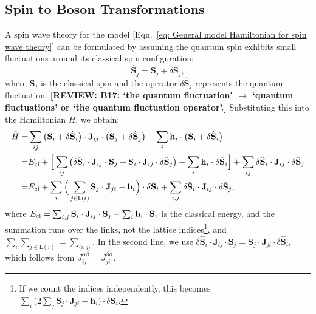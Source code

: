 \documentclass[aps, prx, nofootinbib, superscriptaddress]{revtex4-2}
\newcommand{\REVIEW}[1]{{\color{reviewcolor}\bfseries [REVIEW: #1]}}
\begin{document}
\subsection{Spin to Boson Transformations}\label{subsec: spin-to-boson transformation}
A spin wave theory for the model [Eqn.~\eqref{eq: General model Hamiltonian for spin wave theory}] can be formulated by assuming the quantum spin exhibits small fluctuations around its classical spin configuration:
\begin{equation}
    \hat{\mathbf{S}}_{j} = \mathbf{S}_{j} + \delta \hat{\mathbf{S}}_{j},
\end{equation}
where $\mathbf{S}_{j}$ is the classical spin and the operator $\delta \hat{\mathbf{S}}_{j}$ represents the quantum fluctuation.
\REVIEW{B17: `the quantum fluctuation' $\to$ `quantum fluctuations' or `the quantum fluctuation operator'.}
Substituting this into the Hamiltonian $H$, we obtain:
\begin{align*}
    \hat{H} 
    = & \sum_{ij} \big( \mathbf{S}_{i} + \delta \hat{\mathbf{S}}_{i} \big) \cdot \mathbf{J}_{ij} \cdot \big( \mathbf{S}_{j} + \delta \hat{\mathbf{S}}_{j} \big) - \sum_{i} \mathbf{h}_{i} \cdot \big( \mathbf{S}_{i} + \delta \hat{\mathbf{S}}_{i} \big) \\
    = & E_{\rm cl}
    + \Big[ \sum_{ij} \big( \delta \hat{\mathbf{S}}_{i} \cdot \mathbf{J}_{ij} \cdot \mathbf{S}_{j} + \mathbf{S}_{i} \cdot \mathbf{J}_{ij} \cdot \delta \hat{\mathbf{S}}_{j} \big) - \sum_{i} \mathbf{h}_{i} \cdot \delta \hat{\mathbf{S}}_{i} \Big] 
    + \sum_{ij} \delta \hat{\mathbf{S}}_{i} \cdot \mathbf{J}_{ij} \cdot \delta \hat{\mathbf{S}}_{j} \\
    = & E_{\rm cl}
    + \sum_{i} \Big( \sum_{j \in \mathsf{L}(i)} \mathbf{S}_{j} \cdot \mathbf{J}_{ji} - \mathbf{h}_{i} \Big) \cdot \delta \hat{\mathbf{S}}_{i}
    + \sum_{i,j} \delta \hat{\mathbf{S}}_{i} \cdot \mathbf{J}_{ij} \cdot \delta \hat{\mathbf{S}}_{j},
\end{align*}
where $E_{\rm cl} = \sum_{i,j} \mathbf{S}_{i} \cdot \mathbf{J}_{ij} \cdot \mathbf{S}_{j} - \sum_{i} \mathbf{h}_{i} \cdot \mathbf{S}_{i}$ is the classical energy, and the summation runs over the links, not the lattice indices\footnote{
    If we count the indices independently, this becomes $\sum_{i} \Big( 2 \sum_{j} \mathbf{S}_{j} \cdot \mathbf{J}_{ji} - \mathbf{h}_{i} \Big) \cdot \delta \hat{\mathbf{S}}_{i}$.
    },
and $\sum_{i} \sum_{j \in \mathsf{L}(i)} = \sum_{\langle i, j \rangle}$.
In the second line, we use $\delta \hat{\mathbf{S}}_{i} \cdot \mathbf{J}_{ij} \cdot \mathbf{S}_{j} = \mathbf{S}_{j} \cdot \mathbf{J}_{ji} \cdot \delta \hat{\mathbf{S}}_{i}$, which follows from $J_{ij}^{\alpha\beta} = J_{ji}^{\beta\alpha}$.
\end{document}
